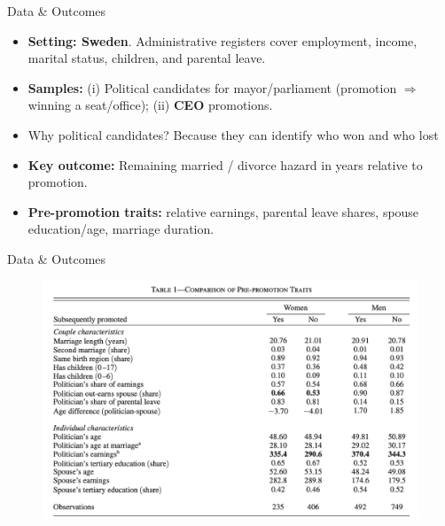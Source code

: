\documentclass[11pt,notes=hide,aspectratio=169,mathserif]{beamer}
\begin{document}
\begin{frame}{Data \& Outcomes}
\small
\begin{itemize}
  \item \textbf{Setting: Sweden}. Administrative registers cover employment, income, marital status, children, and parental leave.
  \item \textbf{Samples:} (i) Political candidates for mayor/parliament (promotion $\Rightarrow$ winning a seat/office); (ii) \textbf{CEO} promotions.
  \item Why political candidates? Because they can identify who won and who lost
  \item \textbf{Key outcome:} Remaining married / divorce hazard in years relative to promotion.
  \item \textbf{Pre-promotion traits:} relative earnings, parental leave shares, spouse education/age, marriage duration. 
\end{itemize}
\end{frame}

\begin{frame}{Data \& Outcomes}
\small
\begin{figure}
\centering
\includegraphics[width=0.8\linewidth]{inputs/table1.png}
\end{figure}
\end{frame}
\end{document}
